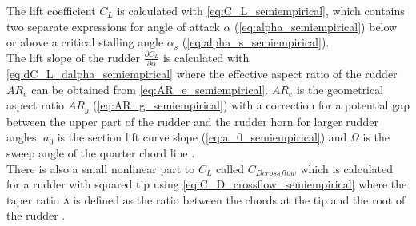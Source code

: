 The lift coefficient $C_L$ is calculated with \autoref{eq:C_L_semiempirical}, which contains two separate expressions for angle of attack $\alpha$ (\autoref{eq:alpha_semiempirical}) below or above a critical stalling angle $\alpha_s$ (\autoref{eq:alpha_s_semiempirical}).
\begin{equation}
    \label{eq:C_L_semiempirical}
    
\end{equation}
%
\begin{equation}
    \label{eq:alpha_s_semiempirical}
    
\end{equation}
%
\begin{equation}
    \label{eq:alpha_semiempirical}
    
\end{equation}
The lift slope of the rudder $\frac{\partial C_L}{\partial \alpha}$ is calculated with \autoref{eq:dC_L_dalpha_semiempirical} where the effective aspect ratio of the rudder $AR_e$ can be obtained from \autoref{eq:AR_e_semiempirical}. $AR_e$ is the geometrical aspect ratio $AR_g$ (\autoref{eq:AR_g_semiempirical}) with a correction for a potential gap between the upper part of the rudder and the rudder horn for larger rudder angles.
$a_0$ is the section lift curve slope (\autoref{eq:a_0_semiempirical}) and $\Omega$ is the sweep angle of the quarter chord line \citep{lewis_principles_1989}.
\begin{equation}
    \label{eq:dC_L_dalpha_semiempirical}
    
\end{equation}
%
\begin{equation}
    \label{eq:AR_e_semiempirical}
    
\end{equation}
%
\begin{equation}
    \label{eq:AR_g_semiempirical}
    
\end{equation}
%
\begin{equation}
    \label{eq:a_0_semiempirical}
    
\end{equation}
There is also a small nonlinear part to $C_L$ called $C_{Dcrossflow}$ which is calculated for a rudder with squared tip using \autoref{eq:C_D_crossflow_semiempirical} where the taper ratio $\lambda$ is defined as the ratio between the chords at the tip and the root of the rudder \citep{hughes_tempest_2011}. 
\begin{equation}
    \label{eq:C_D_crossflow_semiempirical}
    
\end{equation}
%
\begin{equation}
    \label{eq:lambda__semiempirical}
    
\end{equation}
